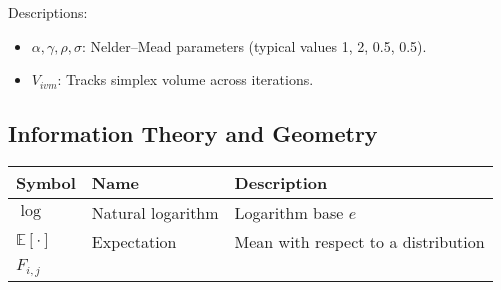 \documentclass[
  10pt,
]{article}
\providecommand{\tightlist}{%
  \setlength{\itemsep}{0pt}\setlength{\parskip}{0pt}}
\begin{document}
Descriptions:

\begin{itemize}
\tightlist
\item
  \(\alpha,\gamma,\rho,\sigma\): Nelder--Mead parameters (typical values
  1, 2, 0.5, 0.5).
\item
  \(V_{ivm}\): Tracks simplex volume across iterations.
\end{itemize}

\hypertarget{information-theory-and-geometry}{%
\subsection{Information Theory and
Geometry}\label{information-theory-and-geometry}}

\begin{longtable}[]{@{}lll@{}}
\toprule
\begin{minipage}[b]{0.30\columnwidth}\raggedright
Symbol\strut
\end{minipage} & \begin{minipage}[b]{0.30\columnwidth}\raggedright
Name\strut
\end{minipage} & \begin{minipage}[b]{0.30\columnwidth}\raggedright
Description\strut
\end{minipage}\tabularnewline
\midrule
\endhead
\begin{minipage}[t]{0.30\columnwidth}\raggedright
\(\log\)\strut
\end{minipage} & \begin{minipage}[t]{0.30\columnwidth}\raggedright
Natural logarithm\strut
\end{minipage} & \begin{minipage}[t]{0.30\columnwidth}\raggedright
Logarithm base \(e\)\strut
\end{minipage}\tabularnewline
\begin{minipage}[t]{0.30\columnwidth}\raggedright
\(\mathbb{E}[\cdot]\)\strut
\end{minipage} & \begin{minipage}[t]{0.30\columnwidth}\raggedright
Expectation\strut
\end{minipage} & \begin{minipage}[t]{0.30\columnwidth}\raggedright
Mean with respect to a distribution\strut
\end{minipage}\tabularnewline
\begin{minipage}[t]{0.30\columnwidth}\raggedright
\(F_{i,j}\)\strut
\end{minipage} & \begin{minipage}[t]{0.30\columnwidth}\raggedright

\end{minipage}
\end{longtable}
\end{document}
